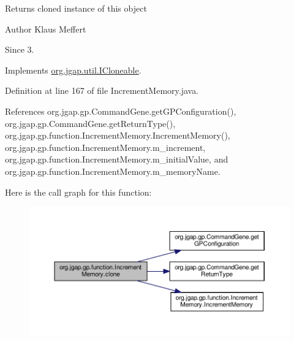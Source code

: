 \begin{DoxyReturn}{Returns}
cloned instance of this object
\end{DoxyReturn}
\begin{DoxyAuthor}{Author}
Klaus Meffert 
\end{DoxyAuthor}
\begin{DoxySince}{Since}
3. 
\end{DoxySince}


Implements \hyperlink{interfaceorg_1_1jgap_1_1util_1_1_i_cloneable_aa7e7d62077e6428ad7904932b1b4f7d5}{org.\-jgap.\-util.\-I\-Cloneable}.



Definition at line 167 of file Increment\-Memory.\-java.



References org.\-jgap.\-gp.\-Command\-Gene.\-get\-G\-P\-Configuration(), org.\-jgap.\-gp.\-Command\-Gene.\-get\-Return\-Type(), org.\-jgap.\-gp.\-function.\-Increment\-Memory.\-Increment\-Memory(), org.\-jgap.\-gp.\-function.\-Increment\-Memory.\-m\-\_\-increment, org.\-jgap.\-gp.\-function.\-Increment\-Memory.\-m\-\_\-initial\-Value, and org.\-jgap.\-gp.\-function.\-Increment\-Memory.\-m\-\_\-memory\-Name.



Here is the call graph for this function\-:
\nopagebreak
\begin{figure}[H]
\begin{center}
\leavevmode
\includegraphics[width=350pt]{classorg_1_1jgap_1_1gp_1_1function_1_1_increment_memory_a2072864a298e71a87d067c5837fb47a5_cgraph}
\end{center}
\end{figure}


